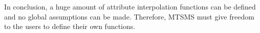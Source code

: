     
In conclusion, a huge amount of attribute interpolation functions can
be defined and no global assumptions can be made. Therefore, MTSMS
must give freedom to the users to define their own functions.




















